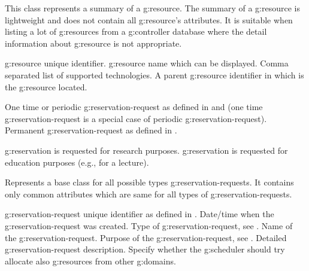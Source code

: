 \begin{Api}
This class represents a summary of a \gls{g:resource}. The summary of a \gls{g:resource} is lightweight and does not contain all \gls{g:resource}'s attributes. It is suitable when listing a lot of \glspl{g:resource} from a \gls{g:controller} database where the detail information about \gls{g:resource} is not appropriate.
\begin{ApiClassAttributes}
 \Gls{g:resource} unique identifier.
 \Gls{g:resource} name which can be displayed.
 Comma separated list of supported technologies.
 A parent \gls{g:resource} identifier in which is the \gls{g:resource} located.
\end{ApiClassAttributes}

\begin{ApiEnumValues}
 One time or periodic \gls{g:reservation-request} as defined in  and  (one time \gls{g:reservation-request} is a special case of periodic \gls{g:reservation-request}).
 Permanent \gls{g:reservation-request} as defined in .
\end{ApiEnumValues}

\begin{ApiEnumValues}
 \Gls{g:reservation} is requested for research purposes.
 \Gls{g:reservation} is requested for education purposes (e.g., for a lecture).
\end{ApiEnumValues}

Represents a base class for all possible types \glspl{g:reservation-request}. It contains only common attributes which are same for all types of \glspl{g:reservation-request}.
\begin{ApiClassAttributes}
 \Gls{g:reservation-request} unique identifier as defined in .
 Date/time when the \gls{g:reservation-request} was created.
 Type of \gls{g:reservation-request}, see .
 Name of the \gls{g:reservation-request}.
 Purpose of the \gls{g:reservation-request}, see .
 Detailed \gls{g:reservation-request} description.
 Specify whether the \gls{g:scheduler} should try allocate also \glspl{g:resource} from other \glspl{g:domain}.
\end{ApiClassAttributes}


\end{Api}
